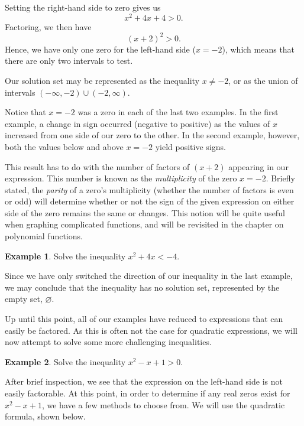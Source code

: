 \documentclass[12pt]{book}
\theoremstyle{definition}
\newtheorem{example}{Example}
\begin{document}
Setting the right-hand side to zero gives us
$$x^2+4x+4>0.$$
Factoring, we then have
$$(x+2)^2>0.$$
Hence, we have only one zero for the left-hand side ($x=-2$), which means that there are only two intervals to test.
\begin{center}
\end{center} 
Our solution set may be represented as the inequality $x\neq -2$, or as the union of intervals $(-\infty,-2)\cup(-2,\infty)$.\par
Notice that $x=-2$ was a zero in each of the last two examples.  In the first example, a change in sign occurred (negative to positive) as the values of $x$ increased from one side of our zero to the other.  In the second example, however, both the values below and above $x=-2$ yield positive signs.\par
This result has to do with the number of factors of $(x+2)$ appearing in our expression.  This number is known as the {\it multiplicity} of the zero $x=-2$.  Briefly stated, the {\it parity} of a zero's multiplicity (whether the number of factors is even or odd) will determine whether or not the sign of the given expression on either side of the zero remains the same or changes.  This notion will be quite useful when graphing complicated functions, and will be revisited in the chapter on polynomial functions.
\begin{example}
Solve the inequality $x^2+4x<-4$.
\end{example}
Since we have only switched the direction of our inequality in the last example, we may conclude that the inequality has no solution set, represented by the empty set, $\varnothing$.\par
Up until this point, all of our examples have reduced to expressions that can easily be factored.  As this is often not the case for quadratic expressions, we will now attempt to solve some more challenging inequalities.
\begin{example}
Solve the inequality $x^2-x+1>0$.
\end{example}
After brief inspection, we see that the expression on the left-hand side is not easily factorable.  At this point, in order to determine if any real zeros exist for $x^2-x+1$, we have a few methods to choose from.  We will use the quadratic formula, shown below.
\end{document}
